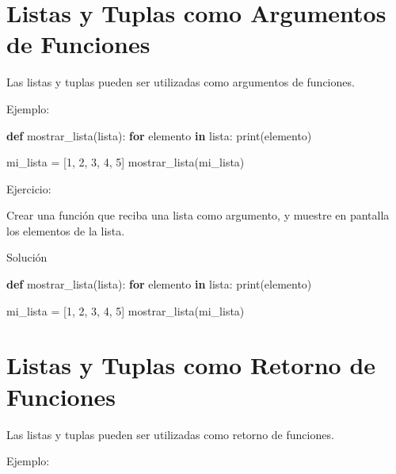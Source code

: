 \documentclass[
  a4paper,
  DIV=11,
  numbers=noendperiod,
  onepage,
  openany]{scrreprt}
\newenvironment{Shaded}{\begin{snugshade}}{\end{snugshade}}
\newcommand{\BuiltInTok}[1]{\textcolor[rgb]{0.00,0.23,0.31}{#1}}
\newcommand{\ControlFlowTok}[1]{\textcolor[rgb]{0.00,0.23,0.31}{\textbf{#1}}}
\newcommand{\DecValTok}[1]{\textcolor[rgb]{0.68,0.00,0.00}{#1}}
\newcommand{\KeywordTok}[1]{\textcolor[rgb]{0.00,0.23,0.31}{\textbf{#1}}}
\newcommand{\NormalTok}[1]{\textcolor[rgb]{0.00,0.23,0.31}{#1}}
\newcommand{\OperatorTok}[1]{\textcolor[rgb]{0.37,0.37,0.37}{#1}}
\begin{document}
\chapter{Listas y Tuplas como Argumentos de
Funciones}\label{listas-y-tuplas-como-argumentos-de-funciones}

Las listas y tuplas pueden ser utilizadas como argumentos de funciones.

Ejemplo:

\begin{Shaded}
\begin{Highlighting}[]
\KeywordTok{def}\NormalTok{ mostrar\_lista(lista):}
    \ControlFlowTok{for}\NormalTok{ elemento }\KeywordTok{in}\NormalTok{ lista:}
        \BuiltInTok{print}\NormalTok{(elemento)}

\NormalTok{mi\_lista }\OperatorTok{=}\NormalTok{ [}\DecValTok{1}\NormalTok{, }\DecValTok{2}\NormalTok{, }\DecValTok{3}\NormalTok{, }\DecValTok{4}\NormalTok{, }\DecValTok{5}\NormalTok{]}
\NormalTok{mostrar\_lista(mi\_lista)}
\end{Highlighting}
\end{Shaded}

Ejercicio:

Crear una función que reciba una lista como argumento, y muestre en
pantalla los elementos de la lista.

Solución

\begin{Shaded}
\begin{Highlighting}[]
  \KeywordTok{def}\NormalTok{ mostrar\_lista(lista):}
      \ControlFlowTok{for}\NormalTok{ elemento }\KeywordTok{in}\NormalTok{ lista:}
          \BuiltInTok{print}\NormalTok{(elemento)}

\NormalTok{  mi\_lista }\OperatorTok{=}\NormalTok{ [}\DecValTok{1}\NormalTok{, }\DecValTok{2}\NormalTok{, }\DecValTok{3}\NormalTok{, }\DecValTok{4}\NormalTok{, }\DecValTok{5}\NormalTok{]}
\NormalTok{  mostrar\_lista(mi\_lista)}
\end{Highlighting}
\end{Shaded}

\chapter{Listas y Tuplas como Retorno de
Funciones}\label{listas-y-tuplas-como-retorno-de-funciones}

Las listas y tuplas pueden ser utilizadas como retorno de funciones.

Ejemplo:
\end{document}
